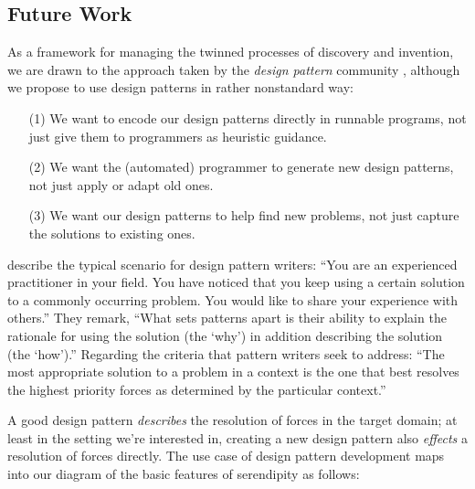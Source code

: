 \subsection{Future Work} \label{sec:futurework} \label{sec:hatching}

As a framework for managing the twinned processes of discovery and invention,
we are drawn to the approach taken by the \emph{design pattern}
community \cite{alexander1999origins}, although we propose to use
design patterns in rather nonstandard way:
\begin{itemize}
\item[(1)] We want to encode our design patterns directly in runnable
  programs, not just give them to programmers as heuristic guidance.
\item[(2)] We want the (automated) programmer to generate new design
  patterns, not just apply or adapt old ones.
\item[(3)] We want our design patterns to help find new problems,
  not just capture the solutions to existing ones.
\end{itemize}

 describe the typical scenario for design
pattern writers: ``You are an experienced practitioner in your
field. You have noticed that you keep using a certain solution to a
commonly occurring problem. You would like to share your experience
with others.''  They remark, ``What sets patterns apart is their
ability to explain the rationale for using the solution (the `why') in
addition describing the solution (the `how').''  Regarding the
criteria that pattern writers seek to address: ``The most appropriate
solution to a problem in a context is the one that best resolves the
highest priority forces as determined by the particular context.'' 

A good design pattern \emph{describes} the resolution of forces in the
target domain; at least in the setting we're interested in, creating a new
design pattern also \emph{effects} a resolution of forces directly.
The use case of design pattern development maps into our diagram of
the basic features of serendipity as follows:



